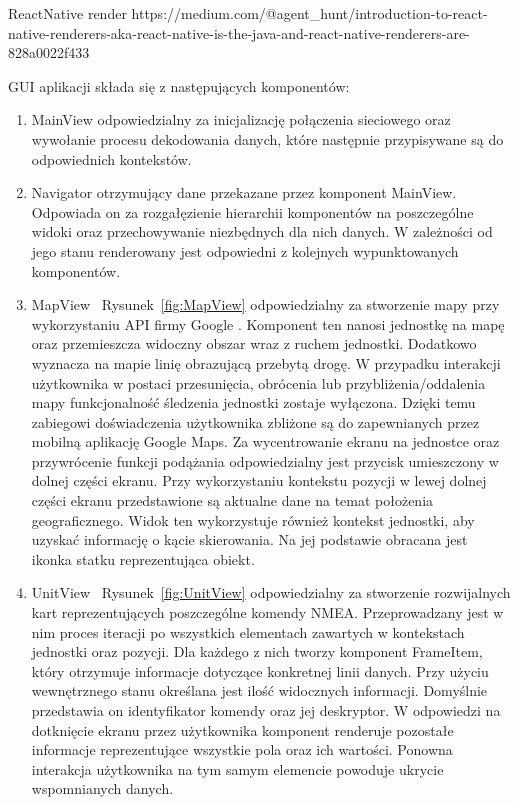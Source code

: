 \documentclass[skorowidz,skroty]{dyplomWEZUT}
\begin{document}
{ReactNative render \label{fig:react-native-renderer}}
{https://medium.com/@agent\_hunt/introduction-to-react-native-renderers-aka-react-native-is-the-java-and-react-native-renderers-are-828a0022f433}
 
	 GUI aplikacji składa się z następujących komponentów:
\begin{enumerate}

\item MainView odpowiedzialny za inicjalizację połączenia sieciowego oraz wywołanie  procesu dekodowania danych, które następnie przypisywane są do odpowiednich kontekstów.

\item Navigator otrzymujący dane przekazane przez komponent MainView. Odpowiada on za rozgałęzienie hierarchii komponentów na poszczególne widoki oraz przechowywanie niezbędnych dla nich danych. W zależności od jego stanu renderowany jest odpowiedni z kolejnych wypunktowanych komponentów.

\item MapView ~Rysunek~\ref{fig:MapView} odpowiedzialny za stworzenie mapy przy wykorzystaniu API firmy Google  . Komponent ten nanosi jednostkę na mapę oraz przemieszcza widoczny obszar wraz z ruchem jednostki. Dodatkowo wyznacza na mapie linię obrazującą przebytą drogę. W przypadku interakcji użytkownika w postaci przesunięcia, obrócenia lub przybliżenia/oddalenia mapy funkcjonalność śledzenia jednostki zostaje wyłączona. Dzięki temu zabiegowi doświadczenia użytkownika zbliżone są do zapewnianych przez mobilną aplikację Google Maps. Za wycentrowanie ekranu na jednostce oraz przywrócenie funkcji podążania odpowiedzialny jest przycisk umieszczony w dolnej części ekranu. Przy wykorzystaniu kontekstu pozycji w lewej dolnej części ekranu przedstawione są aktualne dane na temat położenia geograficznego. Widok ten wykorzystuje również kontekst jednostki, aby uzyskać informację o kącie skierowania. Na jej podstawie obracana jest ikonka statku reprezentująca obiekt.

\item UnitView ~Rysunek~\ref{fig:UnitView} odpowiedzialny za stworzenie rozwijalnych kart reprezentujących poszczególne komendy NMEA. Przeprowadzany jest w nim proces iteracji po wszystkich elementach zawartych w kontekstach jednostki oraz pozycji. Dla każdego z nich tworzy komponent FrameItem, który otrzymuje informacje dotyczące konkretnej linii danych. Przy użyciu wewnętrznego stanu określana jest ilość widocznych informacji. Domyślnie przedstawia on identyfikator komendy oraz jej deskryptor. W odpowiedzi na dotknięcie ekranu przez użytkownika komponent renderuje pozostałe informacje reprezentujące wszystkie pola oraz ich wartości. Ponowna interakcja użytkownika na tym samym elemencie powoduje ukrycie wspomnianych danych.


\end{enumerate}
\end{document}
